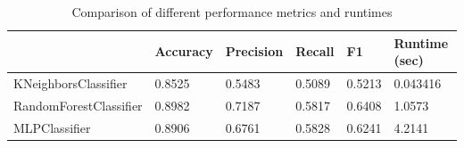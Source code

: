 \documentclass{article}
\begin{document}
\begin{table}[h]
\begin{center}
\begin{tabular}{|l|l|l|l|l|l|}
\hline
                       & Accuracy & Precision & Recall & F1     & Runtime (sec) \\ \hline
KNeighborsClassifier   & 0.8525   & 0.5483  & 0.5089 & 0.5213 & 0.043416        \\ \hline
RandomForestClassifier & 0.8982   & 0.7187    & 0.5817   & 0.6408   & 1.0573        \\ \hline
MLPClassifier          & 0.8906   & 0.6761    & 0.5828   & 0.6241   & 4.2141        \\ \hline
\end{tabular}
\caption{Comparison of different performance metrics and runtimes}
\end{center}
\end{table}
\end{document}
